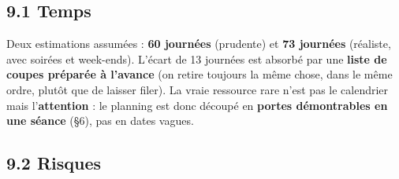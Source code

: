 \documentclass[11pt,a4paper]{article}
\begin{document}
\subsection*{9.1 Temps}
Deux estimations assumées : \textbf{60 journées} (prudente) et \textbf{73 journées} (réaliste, avec soirées et week-ends). L'écart de 13 journées est absorbé par une \textbf{liste de coupes préparée à l'avance} (on retire toujours la même chose, dans le même ordre, plutôt que de laisser filer). La vraie ressource rare n'est pas le calendrier mais l'\textbf{attention} : le planning est donc découpé en \textbf{portes démontrables en une séance} (§6), pas en dates vagues.

\subsection*{9.2 Risques}
\sloppy
\end{document}
